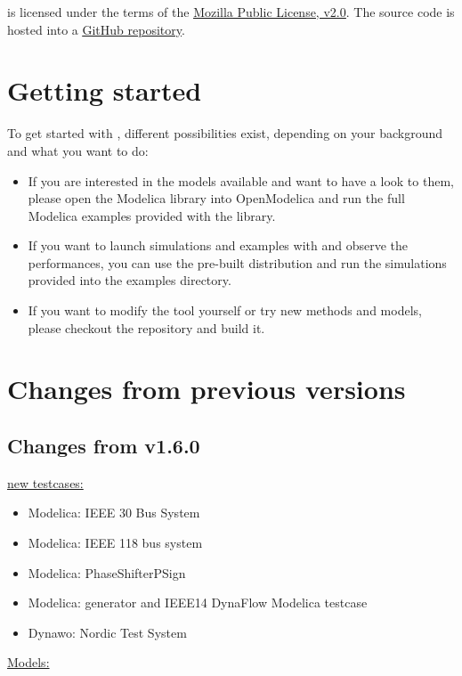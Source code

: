 \documentclass[a4paper, 12pt]{report}
\begin{document}
\Dynawo is licensed under the terms of the \href{http://mozilla.org/MPL/2.0}{\underline{Mozilla Public License, v2.0}}.
The source code is hosted into a \href{https://github.com/dynawo/dynawo} {\underline{GitHub repository}}. \\

\section{Getting started}

To get started with \Dynawo , different possibilities exist, depending on your background and what you want to do:
\begin{itemize}
\item If you are interested in the models available and want to have a look to them, please open the \Dynawo Modelica library into OpenModelica and run the full Modelica examples provided with the library.
\item If you want to launch simulations and examples with \Dynawo and observe the performances, you can use the pre-built distribution and run the simulations provided into the examples directory.
\item If you want to modify the tool yourself or try new methods and models, please checkout the repository and build it.
\end{itemize}

\section{Changes from previous versions}

\subsection{Changes from v1.6.0}

\underline{new testcases:}

\begin{itemize}
\item Modelica: IEEE 30 Bus System
\item Modelica: IEEE 118 bus system
\item Modelica: PhaseShifterPSign
\item Modelica: generator and IEEE14 DynaFlow Modelica testcase
\item Dynawo: Nordic Test System
\end{itemize}

\underline{Models:}
\end{document}
